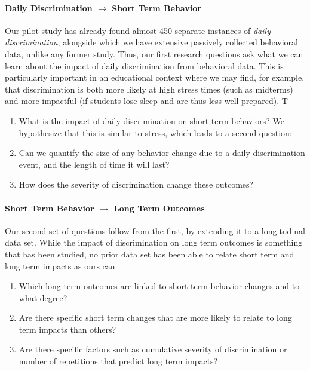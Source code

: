 \paragraph{Daily Discrimination $\rightarrow$ Short Term Behavior} Our pilot study has already found almost 450 separate instances of  \textit{daily discrimination}, alongside which we have extensive passively collected behavioral data, unlike any former study. Thus, our first research questions ask what we can learn about the impact of daily discrimination from behavioral data. This is particularly important in an educational context where we may find, for example, that discrimination is both more likely at high stress times (such as midterms) and more impactful (if students lose sleep and are thus less well prepared). T
\begin{enumerate}[start=1,label={\bfseries RQ\arabic*}, leftmargin=1cm]
    \item \label{itm:rq-behavior} What is the impact of daily discrimination on short term behaviors? We hypothesize that this is similar to stress, which leads to a second question:
    \item \label{itm:rq-behavior-size} Can we quantify the size of any behavior change due to a daily discrimination event, and the length of time it will last? 
    \item \label{itm:rq-severity-impact} How does the severity of discrimination change these outcomes?
\end{enumerate}

\paragraph{Short Term Behavior $\rightarrow$ Long Term Outcomes} Our second set of questions follow from the first, by extending it to a longitudinal data set. While the impact of discrimination on long term outcomes is something that has been studied, no prior data set has been able to relate short term and long term impacts as ours can. 
\begin{enumerate}[start=4,label={\bfseries RQ\arabic*}, leftmargin=1cm]
    \item \label{itm:rq-short-long} Which long-term outcomes are linked to short-term behavior changes and to what degree?
    \item \label{itm:rq-which-long} Are there specific short term changes that are more likely to relate to long term impacts than others?
    \item \label{itm:rq-severity-long} Are there specific factors such as cumulative severity of discrimination or number of repetitions that predict long term impacts?
\end{enumerate}
 
